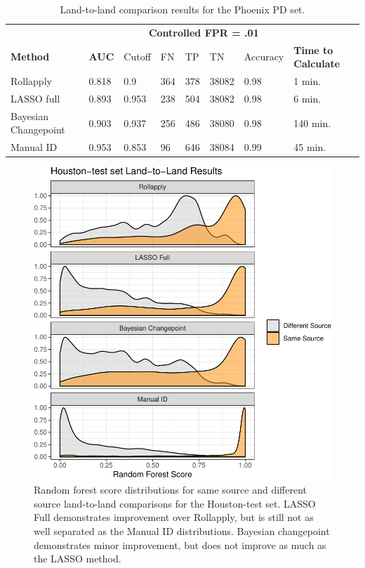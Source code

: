 \documentclass[12pt]{article}
\begin{document}
\begin{table}[]
\centering
\begin{tabular}{llllllll}
& & \multicolumn{5}{c}{\textbf{Controlled FPR = .01}} & \\
\textbf{Method} & \textbf{AUC} & Cutoff & FN &TP & TN & Accuracy & \textbf{Time to Calculate} \\ \hline
Rollapply & 0.818 &  0.9 & 364 & 378&38082 & 0.98& 1 min. \\ \hline
LASSO full & 0.893 &  0.953 &238 &504 &38082 & 0.98  & 6 min. \\ \hline
Bayesian Changepoint & 0.903 &  0.937 &256 & 486&38080 & 0.98 & 140 min. \\ \hline
Manual ID & 0.953 &  0.853 & 96& 646&38084 & 0.99 & 45 min. \\ \hline 
\end{tabular}
\caption{Land-to-land comparison results for the Phoenix PD set.}
\label{phoenix-table}
\end{table}

\begin{figure}
\centering
\includegraphics{writeup_files/figure-latex/houston-groove-results-1.pdf}
\caption{\label{houston-groove-results}Random forest score distributions
for same source and different source land-to-land comparisons for the
Houston-test set. LASSO Full demonstrates improvement over Rollapply,
but is still not as well separated as the Manual ID distributions.
Bayesian changepoint demonstrates minor improvement, but does not
improve as much as the LASSO method.}
\end{figure}
\end{document}
